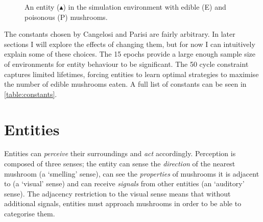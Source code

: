 \documentclass[12pt,a4paper]{report}
\begin{document}
\begin{figure}[ht]
\centering
{}
\caption{An entity ($\blacktriangle$) in the simulation environment with edible (E) and poisonous (P) mushrooms.}
\label{fig:environment}
\end{figure}
The constants chosen by Cangelosi and Parisi are fairly arbitrary. In later sections I will explore the effects of changing them, but for now I can intuitively explain some of these choices. The 15 epochs provide a large enough sample size of environments for entity behaviour to be significant. The 50 cycle constraint captures limited lifetimes, forcing entities to learn optimal strategies to maximise the number of edible mushrooms eaten. A full list of constants can be seen in \cref{table:constants}.


\section{Entities}\label{section:entities}

Entities can \emph{perceive} their surroundings and \emph{act} accordingly. Perception is composed of three senses; the entity can sense the \emph{direction} of the nearest mushroom (a `smelling' sense), can see the \emph{properties} of mushrooms it is adjacent to (a `visual' sense) and can receive \emph{signals} from other entities (an `auditory' sense). The adjacency restriction to the visual sense means that without additional signals, entities must approach mushrooms in order to be able to categorise them.
\end{document}
